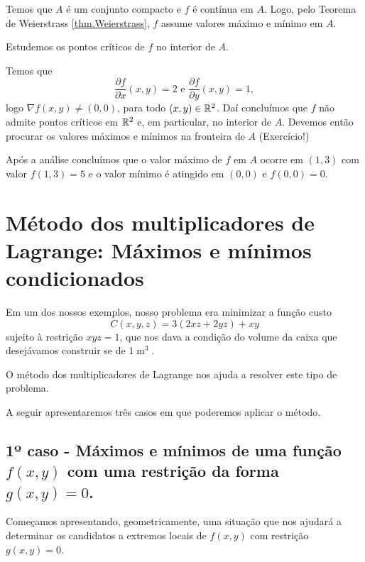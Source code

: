 \begin{example}
    Temos que \(A\) é um conjunto compacto e \(f\) é contínua em \(A\). Logo, pelo Teorema de Weierstrass \ref{thm.Weierstrass}, \(f\) assume valores máximo e mínimo em \(A\).

    Estudemos os pontos críticos de \(f\) no interior de \(A\).

    Temos que \[\frac{\partial f}{\partial x}(x,y) = 2 \text{ e } \frac{\partial f}{\partial y}(x,y) = 1,\] logo \(\nabla f(x,y) \neq (0,0)\), para todo \((x,y)\in\mathbb{R}^2\). Daí concluímos que \(f\) não admite pontos críticos em \(\mathbb{R}^2\) e, em particular, no interior de \(A\). Devemos então procurar os valores máximos e mínimos na fronteira de \(A\) (Exercício!)

    Após a análise concluímos que o valor máximo de \(f\) em \(A\) ocorre em \((1,3)\) com valor \(f(1,3) = 5\) e o valor mínimo é atingido em \((0,0)\) e \(f(0,0) = 0\).
\end{example}

\section{Método dos multiplicadores de Lagrange: Máximos e mínimos condicionados}

Em um dos nossos exemplos, nosso problema era minimizar a função custo \[C(x,y,z) = 3(2xz + 2yz) + xy\] sujeito à restrição \(xyz=1\), que nos dava a condição do volume da caixa que desejávamos construir se de \(1\operatorname{m}^3\).

O método dos multiplicadores de Lagrange nos ajuda a resolver este tipo de problema.

A seguir apresentaremos três casos em que poderemos aplicar o método.

\subsection{1º caso - Máximos e mínimos de uma função \texorpdfstring{\(f(x,y)\)}{f(x,y)} com uma restrição da forma \texorpdfstring{\(g(x,y) = 0\)}{g(x,y)=0}.}

Começamos apresentando, geometricamente, uma situação que nos ajudará a determinar os candidatos a extremos locais de \(f(x,y)\) com restrição \(g(x,y) = 0\).

